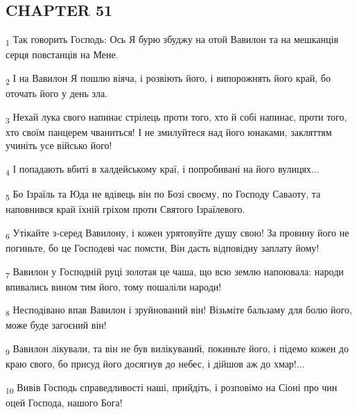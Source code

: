 \subsection{CHAPTER 51}
\begin{tcolorbox}
\textsubscript{1} Так говорить Господь: Ось Я бурю збуджу на отой Вавилон та на мешканців серця повстанців на Мене.
\end{tcolorbox}
\begin{tcolorbox}
\textsubscript{2} І на Вавилон Я пошлю віяча, і розвіють його, і випорожнять його край, бо оточать його у день зла.
\end{tcolorbox}
\begin{tcolorbox}
\textsubscript{3} Нехай лука свого напинає стрілець проти того, хто й собі напинає, проти того, хто своїм панцерем чваниться! І не змилуйтеся над його юнаками, закляттям учиніть усе військо його!
\end{tcolorbox}
\begin{tcolorbox}
\textsubscript{4} І попадають вбиті в халдейському краї, і попробивані на його вулицях...
\end{tcolorbox}
\begin{tcolorbox}
\textsubscript{5} Бо Ізраїль та Юда не вдівець він по Бозі своєму, по Господу Саваоту, та наповнився край їхній гріхом проти Святого Ізраїлевого.
\end{tcolorbox}
\begin{tcolorbox}
\textsubscript{6} Утікайте з-серед Вавилону, і кожен урятовуйте душу свою! За провину його не погиньте, бо це Господеві час помсти, Він дасть відповідну заплату йому!
\end{tcolorbox}
\begin{tcolorbox}
\textsubscript{7} Вавилон у Господній руці золотая це чаша, що всю землю напоювала: народи впивались вином тим його, тому пошаліли народи!
\end{tcolorbox}
\begin{tcolorbox}
\textsubscript{8} Несподівано впав Вавилон і зруйнований він! Візьміте бальзаму для болю його, може буде загоєний він!
\end{tcolorbox}
\begin{tcolorbox}
\textsubscript{9} Вавилон лікували, та він не був вилікуваний, покиньте його, і підемо кожен до краю свого, бо присуд його досягнув до небес, і дійшов аж до хмар!...
\end{tcolorbox}
\begin{tcolorbox}
\textsubscript{10} Вивів Господь справедливості наші, прийдіть, і розповімо на Сіоні про чин оцей Господа, нашого Бога!
\end{tcolorbox}
